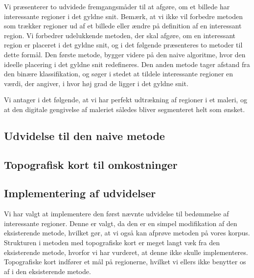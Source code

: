 {
{\sffamily Vi præsenterer to udvidede fremgangsmåder til at afgøre, om
et billede har interessante regioner i det gyldne snit. Bemærk, at vi
ikke vil forbedre metoden som trækker regioner ud af et billede eller
ændre på definition af en interessant region. Vi forbedrer udelukkende
metoden, der skal afgøre, om en interessant region er placeret i det
gyldne snit, og i det følgende præsenteres to metoder til dette formål.
Den første metode, bygger videre på den naive algoritme, hvor den
ideelle placering i det gyldne snit redefineres. Den anden metode tager
afstand fra den binære klassifikation, og søger i stedet at tildele
interessante regioner en værdi, der angiver, i hvor høj grad de ligger i
det gyldne snit.

Vi antager i det følgende, at vi har perfekt udtrækning af regioner i et
maleri, og at den digitale gengivelse af maleriet således bliver
segmenteret helt som ønsket.
}

\subsection{Udvidelse til den naive metode\label{subsec_udvidet_massemidtpunkt}}


\subsection{Topografisk kort til omkostninger}


\subsection{Implementering af udvidelser}
Vi har valgt at implementere den først nævnte udvidelse til bedømmelse
af interessante regioner. Denne er valgt, da den er en simpel
modifikation af den eksisterende metode, hvilket gør, at vi også kan
afprøve metoden på vores korpus. Strukturen i metoden med topografiske
kort er meget langt væk fra den eksisterende metode, hvorfor vi har
vurderet, at denne ikke skulle implementeres. Topografiske kort indfører
et mål på regionerne, hvilket vi ellers ikke benytter os af i den
eksisterende metode.

}


